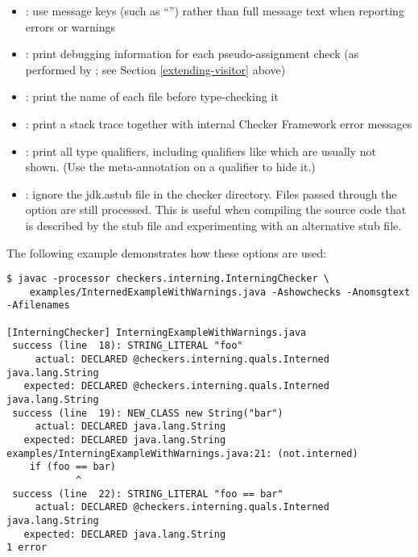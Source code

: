 \begin{itemize}

\item {}: use message keys (such as ``'')
rather than full message text when reporting errors or warnings

\item {}: print debugging information for each
pseudo-assignment check (as performed by ; see Section
\ref{extending-visitor} above)

\item {}: print the name of each file before type-checking it

\item {}: print a stack trace together with
internal Checker Framework error messages

\item {}: print all type qualifiers, including
qualifiers like  which are usually not shown.
(Use the  meta-annotation on a qualifier to hide it.)

\item {}: ignore the jdk.astub file in the checker
directory. Files passed through the  option are still processed. This is useful when
compiling the source code that is described by the stub file and experimenting with an
alternative stub file.

\end{itemize}

The following example demonstrates how these options are used:

\begin{smaller}
\begin{Verbatim}
$ javac -processor checkers.interning.InterningChecker \
    examples/InternedExampleWithWarnings.java -Ashowchecks -Anomsgtext -Afilenames

[InterningChecker] InterningExampleWithWarnings.java
 success (line  18): STRING_LITERAL "foo"
     actual: DECLARED @checkers.interning.quals.Interned java.lang.String
   expected: DECLARED @checkers.interning.quals.Interned java.lang.String
 success (line  19): NEW_CLASS new String("bar")
     actual: DECLARED java.lang.String
   expected: DECLARED java.lang.String
examples/InterningExampleWithWarnings.java:21: (not.interned)
    if (foo == bar)
            ^
 success (line  22): STRING_LITERAL "foo == bar"
     actual: DECLARED @checkers.interning.quals.Interned java.lang.String
   expected: DECLARED java.lang.String
1 error
\end{Verbatim}
\end{smaller}

